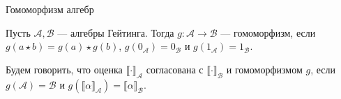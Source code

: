 \documentclass[aspectratio=169]{beamer}
\begin{document}

\begin{frame}{Гомоморфизм алгебр}
\begin{defrus}Пусть $\mathcal{A}, \mathcal{B}$ --- алгебры Гейтинга. Тогда $g: \mathcal{A} \rightarrow \mathcal{B}$ --- гомоморфизм,
если $g(a \star b) = g(a) \star g(b)$, $g(0_\mathcal{A}) = 0_\mathcal{B}$ и $g(1_\mathcal{A}) = 1_\mathcal{B}$.\end{defrus}
\begin{defrus}Будем говорить, что оценка $\llbracket\cdot\rrbracket_\mathcal{A}$ согласована
с $\llbracket\cdot\rrbracket_\mathcal{B}$ и гомоморфизмом $g$, если $g(\mathcal{A}) = \mathcal{B}$ и
$g(\llbracket\alpha\rrbracket_\mathcal{A}) = \llbracket\alpha\rrbracket_\mathcal{B}$.
\end{defrus}
\end{frame}
\end{document}
